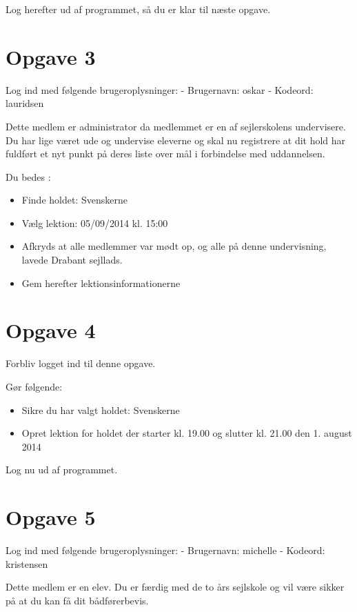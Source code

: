 Log herefter ud af programmet, så du er klar til næste opgave.
 
\section{Opgave 3}

Log ind med følgende brugeroplysninger: 
\newline - Brugernavn: oskar
\newline - Kodeord: lauridsen

Dette medlem er administrator da medlemmet er en af sejlerskolens undervisere.
Du har lige været ude og undervise eleverne og skal nu registrere at dit hold har fuldført et nyt punkt på deres liste over mål i forbindelse med uddannelsen.

Du bedes :

\begin{itemize}
\item Finde holdet: Svenskerne
\item Vælg lektion: 05/09/2014 kl. 15:00 
\item Afkryds at alle medlemmer var mødt op, og alle på denne undervisning, lavede Drabant sejllads.
\item Gem herefter lektionsinformationerne
\end{itemize}


\section{Opgave 4}

Forbliv logget ind til denne opgave.

Gør følgende:
\begin{itemize}
\item Sikre du har valgt holdet: Svenskerne
\item Opret lektion for holdet der starter kl. 19.00 og slutter kl. 21.00 den 1. august 2014
\end{itemize}

Log nu ud af programmet.

\section{Opgave 5}

Log ind med følgende brugeroplysninger: 
\newline - Brugernavn: michelle
\newline - Kodeord: kristensen

Dette medlem er en elev. Du er færdig med de to års sejlskole og vil være sikker på at du kan få dit bådførerbevis.


